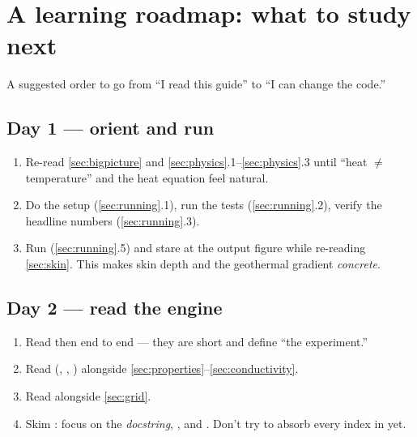\section{A learning roadmap: what to study next}
\label{sec:roadmap}

A suggested order to go from ``I read this guide'' to ``I can change the code.''

\subsection*{Day 1 --- orient and run}
\begin{enumerate}[leftmargin=1.6em,itemsep=3pt]
  \item Re-read \autoref{sec:bigpicture} and
    \autoref{sec:physics}.1--\ref{sec:physics}.3 until ``heat $\ne$ temperature''
    and the heat equation feel natural.
  \item Do the setup (\autoref{sec:running}.1), run the tests
    (\autoref{sec:running}.2), verify the headline numbers
    (\autoref{sec:running}.3).
  \item Run 
    (\autoref{sec:running}.5) and stare at the output figure while re-reading
    \autoref{sec:skin}. This makes skin depth and the geothermal gradient
    \emph{concrete}.
\end{enumerate}

\subsection*{Day 2 --- read the engine}
\begin{enumerate}[leftmargin=1.6em,itemsep=3pt,start=4]
  \item Read  then  end to end ---
    they are short and define ``the experiment.''
  \item Read  (,
    , ) alongside
    \autoref{sec:properties}--\ref{sec:conductivity}.
  \item Read  alongside \autoref{sec:grid}.
  \item Skim : focus on the \emph{docstring},
    , and . Don't try to
    absorb every index in  yet.
\end{enumerate}

